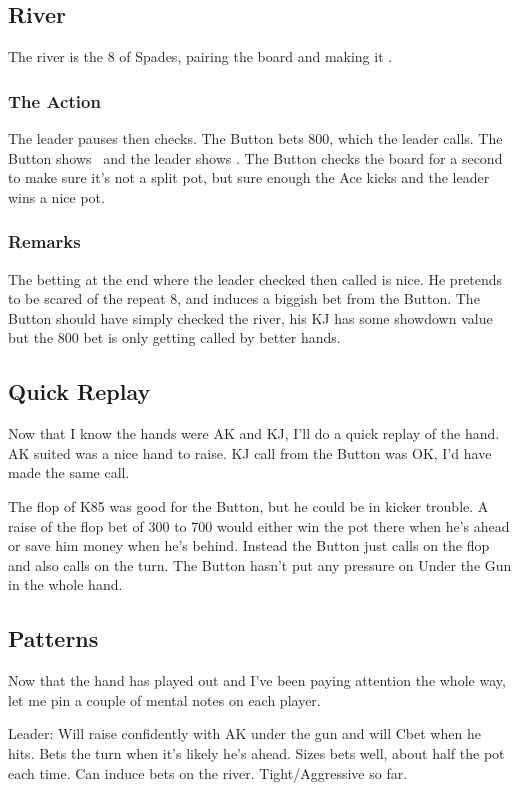 \subsection*{River}
The river is the 8 of Spades, pairing the board and making
it \Kc\eigd\fived\fours\eigs. 

\subsubsection*{The Action}
The leader pauses then checks. The Button bets 800, which the leader calls.
The Button shows \Kd\Jc\ and the leader shows \As\Ks. The Button checks the board
for a second to make sure it's not a split pot, but sure enough the
Ace kicks and the leader wins a nice pot.

\subsubsection*{Remarks}
The betting at the end where the leader checked then called is nice. He
pretends to be scared of the repeat 8, and induces a biggish bet from the
Button. The Button should have simply checked the river, his KJ has some
showdown value but the 800 bet is only getting called by better hands.

\subsection*{Quick Replay}

Now that I know the hands were AK and KJ, I'll do a quick replay
of the hand. AK suited was a nice hand to raise. KJ call from the
Button was OK, I'd have made the same call.

The flop of K85 was good for the Button, but he could be in kicker
trouble. A raise of the flop bet of 300 to 700 would either win the
pot there when he's ahead or save him money when he's behind. Instead
the Button just calls on the flop and also calls on the turn. The
Button hasn't put any pressure on Under the Gun in the whole hand.

\subsection*{Patterns}

Now that the hand has played out and I've been paying attention the whole
way, let me pin a couple of mental notes on each player.

Leader: Will raise confidently with AK under the gun and will Cbet when
he hits. Bets the turn when it's likely he's ahead. Sizes bets well, about
half the pot each time. Can induce bets on the river. Tight/Aggressive so far.


